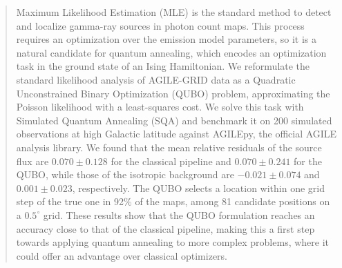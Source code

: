 \documentclass[11pt,twoside]{article}
\begin{document}


\begin{abstract}
Maximum Likelihood Estimation (MLE) is the standard method to detect and localize gamma-ray sources in photon count maps. This process requires an optimization over the emission model parameters, so it is a natural candidate for quantum annealing, which encodes an optimization task in the ground state of an Ising Hamiltonian. We reformulate the standard likelihood analysis of AGILE-GRID data as a Quadratic Unconstrained Binary Optimization (QUBO) problem, approximating the Poisson likelihood with a least-squares cost. We solve this task with Simulated Quantum Annealing (SQA) and benchmark it on 200 simulated observations at high Galactic latitude against AGILEpy, the official AGILE analysis library. We found that the mean relative residuals of the source flux are $0.070 \pm 0.128$ for the classical pipeline and $0.070 \pm 0.241$ for the QUBO, while those of the isotropic background are $-0.021 \pm 0.074$ and $0.001 \pm 0.023$, respectively. The QUBO selects a location within one grid step of the true one in 92\% of the maps, among 81 candidate positions on a $0.5^\circ$ grid. These results show that the QUBO formulation reaches an accuracy close to that of the classical pipeline, making this a first step towards applying quantum annealing to more complex problems, where it could offer an advantage over classical optimizers.
\end{abstract}


\end{document}
